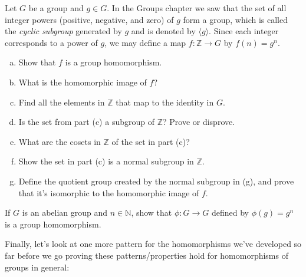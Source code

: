 \begin{exercise}\label{exercise:homomorph:homo_Zn}
Let $G$ be a group and $g \in G$. In the Groups chapter we saw that the set of all integer powers (positive, negative, and zero) of $g$ form a group, which is called the
\emph{cyclic subgroup} generated by $g$ and is denoted by $\langle g \rangle$. 
Since each integer corresponds to a power of $g$, we may define a map $f : {\mathbb Z}
\rightarrow G$ by $f( n ) = g^n$. 
\begin{enumerate}[(a)]
\item
Show that $f$ is a group
homomorphism.
\item 
What is the homomorphic image of $f$?
\item
Find all the elements in ${\mathbb Z}$ that map  to the identity in $G$.
\item
Is the set from part (c) a subgroup of ${\mathbb Z}$?  Prove or disprove.
\item
What are the cosets in ${\mathbb Z}$ of the set in part (c)?
\item
Show the set in part (c) is a normal subgroup in ${\mathbb Z}$.
\item
Define the quotient group created by the normal subgroup in (g), and prove that it's isomorphic to  the homomorphic image of $f$.
\end{enumerate}
\end{exercise}


 
\begin{exercise}
If $G$ is an abelian group and $n \in {\mathbb N}$, show that $\phi : G
\rightarrow G$  defined by $\phi(g) = g^n$ is a group homomorphism.  
\end{exercise}

Finally, let's look at one more pattern for the homomorphisms we've developed so far before we go proving these patterns/properties hold for homomorphisms of groups in general:

